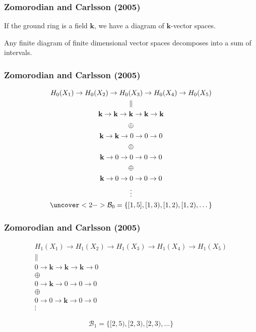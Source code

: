\documentclass[11pt]{beamer}
\begin{document}
\begin{frame}
\frametitle{Zomorodian and Carlsson (2005)}
If the ground ring is a field $\mathbf{k}$, we have a diagram of $\mathbf{k}$-vector spaces.

\begin{theorem}
Any finite diagram of finite dimensional vector spaces decomposes into a sum of intervals.
\end{theorem}
\end{frame}

\begin{frame}
\frametitle{Zomorodian and Carlsson (2005)}
\begin{gather*}
H_0(X_{1}) \to H_0(X_{2}) \to H_0(X_{3}) \to H_0(X_{4}) \to H_0(X_{5}) \\
\parallel \\ \mathbf{k} \to \mathbf{k} \to \mathbf{k} \to \mathbf{k} \to \mathbf{k} \\[1px]
\oplus \\ \mathbf{k} \to \mathbf{k} \to 0 \to 0 \to 0 \\
\oplus \\ \mathbf{k} \to 0 \to 0 \to 0 \to 0 \\
\oplus \\ \mathbf{k} \to 0 \to 0 \to 0 \to 0 \\
\vdots \\
\uncover<2->{\mathcal{B}_0 = \{[1, 5], [1, 3), [1, 2), [1, 2), \dots \}}
\end{gather*}

\end{frame}

\begin{frame}
\frametitle{Zomorodian and Carlsson (2005)}
\begin{gather*}
H_1(X_{1}) \to H_1(X_{2}) \to H_1(X_{3}) \to H_1(X_{4}) \to H_1(X_{5}) \\
\parallel \\ 0 \to \mathbf{k} \to \mathbf{k} \to \mathbf{k} \to 0 \\
\oplus \\ 0 \to \mathbf{k} \to 0 \to 0 \to 0 \\
\oplus \\ 0 \to 0 \to \mathbf{k} \to 0 \to 0 \\
\vdots
\end{gather*}

\begin{align*}
\mathcal{B}_1 = \{[2,5), [2,3), [2,3), \dots \}
\end{align*}
\end{frame}
\end{document}

